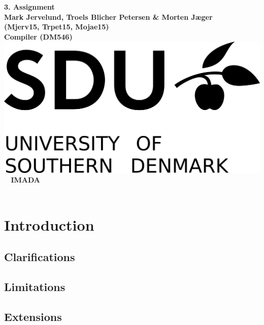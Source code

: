 \documentclass{article}
\begin{document}
\begin{titlepage}
\centering
    \vspace*{9\baselineskip}
    \huge
    \bfseries
    3. Assignment \\
    \normalfont
    Mark Jervelund, Troels Blicher Petersen \& Morten Jæger  \\
    (Mjerv15, Trpet15, Mojae15) \\
	\huge
    Compiler (DM546)  \\[4\baselineskip]
    \normalfont
	\includegraphics[scale=1]{img/SDU_logo}
    \vfill\
    \vspace{5mm}
    IMADA \\

    \textbf{\datedate} \\[2\baselineskip]
\end{titlepage}

\renewcommand{\thepage}{\roman{page}}%
\tableofcontents
\newpage
\setcounter{page}{1}
\renewcommand{\thepage}{\arabic{page}}


\newpage

\section{Introduction}

\subsection{Clarifications}

\subsection{Limitations}

\subsection{Extensions}
\end{document}
